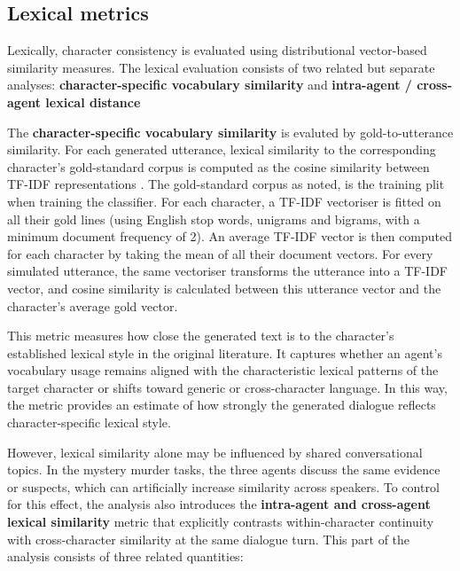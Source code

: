 \documentclass{article}
\begin{document}
\subsection{Lexical metrics} \label{sec:eval_lexical}

Lexically, character consistency is evaluated using distributional vector-based similarity measures. The lexical evaluation consists of two related but separate analyses: \textbf{character-specific vocabulary similarity} and \textbf{intra-agent / cross-agent lexical distance}

The \textbf{character-specific vocabulary similarity} is evaluted by gold-to-utterance similarity. For each generated utterance, lexical similarity to the corresponding character's gold-standard corpus is computed as the cosine similarity between TF-IDF representations \citep{salton1988tdidf}. The gold-standard corpus as noted, is the training plit when training the classifier. For each character, a TF-IDF vectoriser is fitted on all their gold lines (using English stop words, unigrams and bigrams, with a minimum document frequency of 2). An average TF-IDF vector is then computed for each character by taking the mean of all their document vectors. For every simulated utterance, the same vectoriser transforms the utterance into a TF-IDF vector, and cosine similarity is calculated between this utterance vector and the character's average gold vector. 

This metric measures how close the generated text is to the character's established lexical style in the original literature. It captures whether an agent's vocabulary usage remains aligned with the characteristic lexical patterns of the target character or shifts toward generic or cross-character language. In this way, the metric provides an estimate of how strongly the generated dialogue reflects character-specific lexical style.

However, lexical similarity alone may be influenced by shared conversational topics. In the mystery murder tasks, the three agents discuss the same evidence or suspects, which can artificially increase similarity across speakers. To control for this effect, the analysis also introduces the \textbf{intra-agent and cross-agent lexical similarity} metric that explicitly contrasts within-character continuity with cross-character similarity at the same dialogue turn. This part of the analysis consists of three related quantities:
\end{document}
